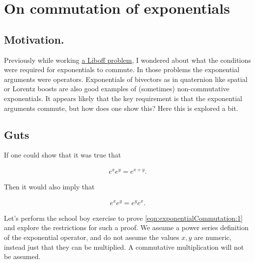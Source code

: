 
%

\chapter{On commutation of exponentials}
\label{chap:exponentialCommutation}
{}
\date{May 30, 2010}

\beginArtNoToc

\section{Motivation.}

Previously while working 
\href{http://peeterjoot.wordpress.com/2010/05/23/effect-of-sinusoid-operators/}{a Liboff problem}, I wondered about what the conditions were required for exponentials to commute.  In those problems the exponential arguments were operators.  Exponentials of bivectors as in quaternion like spatial or Lorentz boosts are also good examples of (sometimes) non-commutative exponentials.  It appears likely that the key requirement is that the exponential arguments commute, but how does one show this?  Here this is explored a bit.

\section{Guts}

If one could show that it was true that

\begin{align}\label{eqn:exponentialCommutation:1}
e^{x} e^{y} = e^{x + y}.
\end{align}

Then it would also imply that 

\begin{align}\label{eqn:exponentialCommutation:2}
e^{x} e^{y} = e^{y} e^{x}.
\end{align}

Let's perform the school boy exercise to prove \ref{eqn:exponentialCommutation:1} and explore the restrictions for such a proof.  We assume a power series definition of the exponential operator, and do not assume the values $x,y$ are numeric, instead just that they can be multiplied.  A commutative multiplication will not be assumed.

